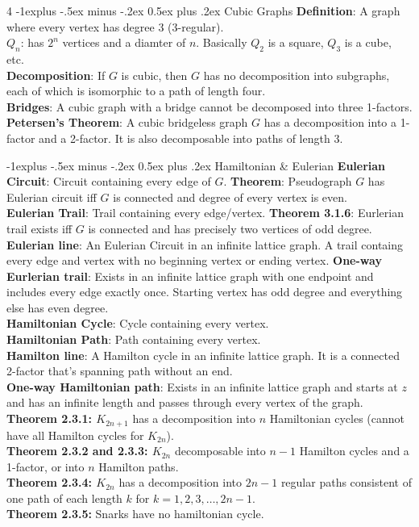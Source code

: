 \documentclass[letterpaper, 8pt]{extarticle}
\makeatletter
\renewcommand{\section}{\@startsection{section}{1}{0mm}%
	{-1explus -.5ex minus -.2ex}%
	{0.5ex plus .2ex}%
	{\normalfont\normalsize\bfseries}}
\makeatother
\begin{document}
\begin{multicols*}{4}
	\section{Cubic Graphs}
	\textbf{Definition}: A graph where every vertex has degree 3 (3-regular). \\
	\textbf{$Q_n$}: has $2^n$ vertices and a diamter of $n$. Basically $Q_2$ is a square, $Q_3$ is a cube, etc.\\
	\textbf{Decomposition}: If $G$ is cubic, then $G$ has no decomposition into subgraphs, each of which is isomorphic to a path of length four. \\
	\textbf{Bridges}: A cubic graph with a bridge cannot be decomposed into three 1-factors. \\
	\textbf{Petersen's Theorem}: A cubic bridgeless graph $G$ has a decomposition into a 1-factor and a 2-factor. It is also decomposable into paths of length 3.

	\section{Hamiltonian \& Eulerian}
	\textbf{Eulerian Circuit}: Circuit containing every edge of $G$.
	\textbf{Theorem}: Pseudograph $G$ has Eulerian circuit iff $G$ is connected and degree of every vertex is even. \\
	\textbf{Eulerian Trail}: Trail containing every edge/vertex.
	\textbf{Theorem 3.1.6}: Eurlerian trail exists iff $G$ is connected and has precisely two vertices of odd degree. \\
	\textbf{Eulerian line}: An Eulerian Circuit in an infinite lattice graph. A trail containg every edge and vertex with no beginning vertex or ending vertex.
	\textbf{One-way Eurlerian trail}: Exists in an infinite lattice graph with one endpoint and includes every edge exactly once. Starting vertex has odd degree and everything else has even degree. \\
	\textbf{Hamiltonian Cycle}: Cycle containing every vertex. \\
	\textbf{Hamiltonian Path}: Path containing every vertex. \\
	\textbf{Hamilton line}: A Hamilton cycle in an infinite lattice graph. It is a connected 2-factor that's spanning path without an end. \\
	\textbf{One-way Hamiltonian path}: Exists in an infinite lattice graph and starts at $z$ and has an infinite length and passes through every vertex of the graph. \\
	\textbf{Theorem 2.3.1: $K_{2n+1}$} has a decomposition into $n$ Hamiltonian cycles (cannot have all Hamilton cycles for $K_{2n}$). \\
	\textbf{Theorem 2.3.2 and 2.3.3: $K_{2n}$} decomposable into $n-1$ Hamilton cycles and a 1-factor, or into $n$ Hamilton paths. \\
	\textbf{Theorem 2.3.4: $K_{2n}$} has a decomposition into $2n-1$ regular paths consistent of one path of each length $k$ for $k = 1, 2, 3, \dots, 2n-1$. \\
	\textbf{Theorem 2.3.5:} Snarks have no hamiltonian cycle.


\end{multicols*}
\end{document}
